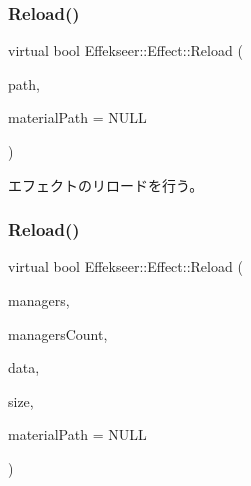\subsubsection{\texorpdfstring{Reload()}{Reload()}\hspace{0.1cm}{\footnotesize\ttfamily [2/4]}}
{\footnotesize\ttfamily virtual bool Effekseer\+::\+Effect\+::\+Reload (\begin{DoxyParamCaption}\item[{const \mbox{\hyperlink{_effekseer_8h_aca7eb5de6dd019c19ac58ea35a193f2f}{E\+F\+K\+\_\+\+C\+H\+AR}} $\ast$}]{path,  }\item[{const \mbox{\hyperlink{_effekseer_8h_aca7eb5de6dd019c19ac58ea35a193f2f}{E\+F\+K\+\_\+\+C\+H\+AR}} $\ast$}]{material\+Path = {\ttfamily NULL} }\end{DoxyParamCaption})\hspace{0.3cm}{\ttfamily [pure virtual]}}



エフェクトのリロードを行う。 

\mbox{\label{class_effekseer_1_1_effect_a3159f076cc1c4201287c36867d5e1566}} 
\subsubsection{\texorpdfstring{Reload()}{Reload()}\hspace{0.1cm}{\footnotesize\ttfamily [3/4]}}
{\footnotesize\ttfamily virtual bool Effekseer\+::\+Effect\+::\+Reload (\begin{DoxyParamCaption}\item[{\mbox{\hyperlink{class_effekseer_1_1_manager}{Manager}} $\ast$}]{managers,  }\item[{int32\+\_\+t}]{managers\+Count,  }\item[{\mbox{\hyperlink{namespace_effekseer_ab34c4088e512200cf4c2716f168deb56}{void}} $\ast$}]{data,  }\item[{int32\+\_\+t}]{size,  }\item[{const \mbox{\hyperlink{_effekseer_8h_aca7eb5de6dd019c19ac58ea35a193f2f}{E\+F\+K\+\_\+\+C\+H\+AR}} $\ast$}]{material\+Path = {\ttfamily NULL} }\end{DoxyParamCaption})\hspace{0.3cm}{\ttfamily [pure virtual]}}



